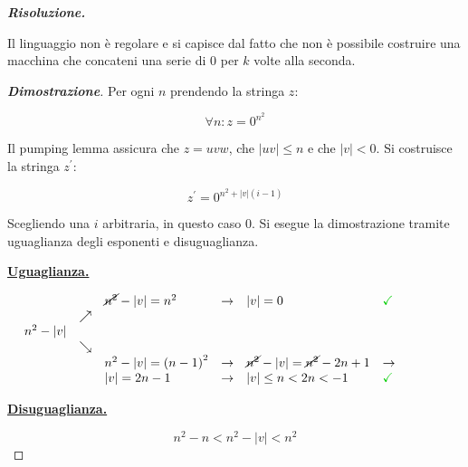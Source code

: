 \documentclass[a4paper]{article}
\begin{document}
	\noindent
	\textcolor{Green4}{\textbf{\emph{Risoluzione.}}}\newline
	
	\noindent
	Il linguaggio non è regolare e si capisce dal fatto che non è possibile costruire una macchina che concateni una serie di $0$ per $k$ volte alla seconda.
	
	\begin{proof}[\textcolor{Blue3}{\textbf{Dimostrazione}}]
		Per ogni $n$ prendendo la stringa $z$:
		
		\begin{equation*}
			\forall n : z = 0^{n^{2}}
		\end{equation*}
	
		\noindent
		Il pumping lemma assicura che $z = uvw$, che $|uv| \le n$ e che $|v| < 0$. Si costruisce la stringa $z^{'}$:
		
		\begin{equation}
			z^{'} = 0^{n^{2} + |v| \left(i - 1\right)}
		\end{equation}
	
		Scegliendo una $i$ arbitraria, in questo caso $0$. Si esegue la dimostrazione tramite uguaglianza degli esponenti e disuguaglianza.\newline
		
		\noindent
		\textbf{\underline{Uguaglianza.}}
		
		\begin{equation*}
			\begin{array}{llllllllll}
				&& \cancel{n^{2}} - |v| = n^{2}			& \rightarrow	& |v| = 0											& \textcolor{Green3}{\textbf{\checkmark}} &&&& \\
				& \nearrow &&&&&&&& \\
				n^{2} - |v| &&&&&&&&& \\
				& \searrow &&&&&&&& \\
				&& n^{2} - |v| = \left(n - 1\right)^{2}	& \rightarrow 	& \cancel{n^{2}} - |v| = \cancel{n^{2}} - 2n + 1	& \rightarrow	&&&& \\
				&& |v| = 2n - 1	& \rightarrow & |v| \le n < 2n < -1	& \textcolor{Green3}{\textbf{\checkmark}} &&&&
			\end{array}
		\end{equation*}
	
		\noindent
		\textbf{\underline{Disuguaglianza.}}
		
		\begin{equation*}
			n ^{2} - n < n^{2} - |v| < n^{2}
		\end{equation*}
	\end{proof}
\end{document}
